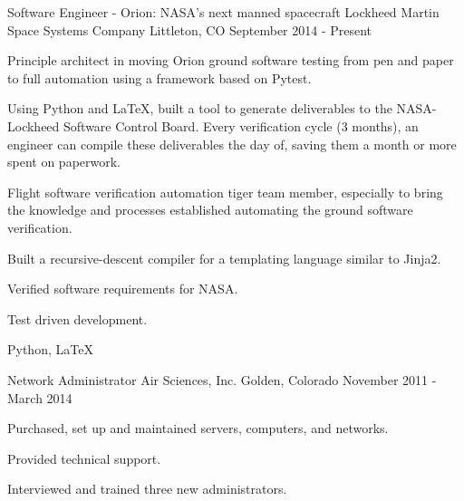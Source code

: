

\begin{cventries}

  \cventry
    {Software Engineer - Orion: NASA's next manned spacecraft} %
    {Lockheed Martin Space Systems Company} %
    {Littleton, CO} %
    {September 2014 - Present} %
    {
      \begin{cvitems} %
        \item {Principle architect in moving Orion ground software testing from pen and paper to full automation using a framework based on Pytest.}
        \item {Using Python and LaTeX, built a tool to generate deliverables to the NASA-Lockheed Software Control Board.  Every verification cycle (3 months), an engineer can compile these deliverables the day of, saving them a month or more spent on paperwork.}
        \item {Flight software verification automation tiger team member, especially to bring the knowledge and processes established automating the ground software verification.}
        \item {Built a recursive-descent compiler for a templating language similar to Jinja2.}
        \item {Verified software requirements for NASA.}
        \item {Test driven development.}
      \end{cvitems}
    }
    \begin{cvskills}
        {Python, LaTeX}
    \end{cvskills}

  \cventry
    {Network Administrator} %
    {Air Sciences, Inc.} %
    {Golden, Colorado} %
    {November 2011 - March 2014} %
    {
      \begin{cvitems} %
        \item {Purchased, set up and maintained servers, computers, and networks.}
        \item {Provided technical support.}
        \item {Interviewed and trained three new administrators.}
      \end{cvitems}
    }


\end{cventries}
